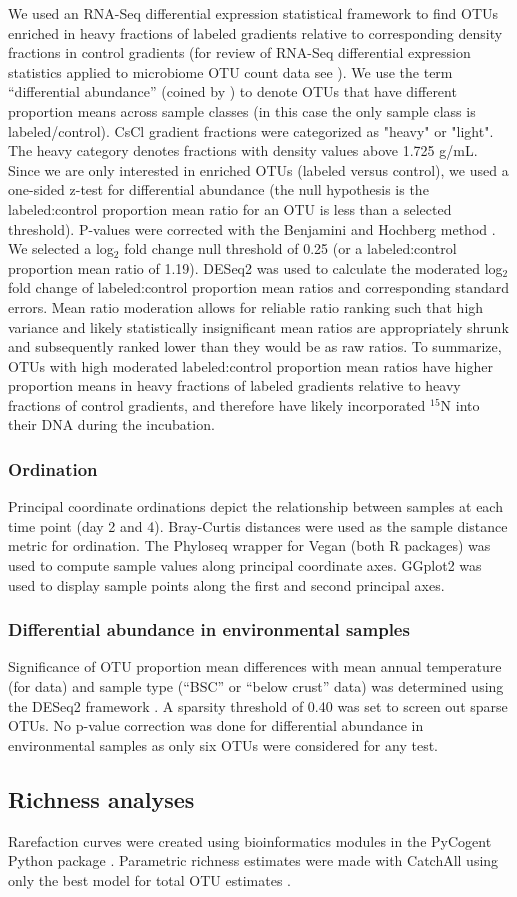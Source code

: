 We used an RNA-Seq differential expression statistical framework
\citep{Love_2014} to find OTUs enriched in heavy fractions of labeled
gradients relative to corresponding density fractions in control gradients
(for review of RNA-Seq differential expression statistics applied to
microbiome OTU count data see \citet{24699258}). We use the term
“differential abundance” (coined by \citet{24699258}) to denote OTUs that
have different proportion means across sample classes (in this case the only
sample class is labeled/control).  CsCl gradient fractions were categorized
as "heavy" or "light". The heavy category denotes fractions with density
values above 1.725 g/mL. Since we are only interested in enriched OTUs
(labeled versus control), we used a one-sided z-test for differential
abundance (the null hypothesis is the labeled:control proportion mean ratio
for an OTU is less than a selected threshold). P-values were corrected with
the Benjamini and Hochberg method \citep{citeulike:1042553}. We selected a
log$_{2}$ fold change null threshold of 0.25 (or a labeled:control proportion
mean ratio of 1.19). DESeq2 was used to calculate the moderated log$_{2}$
fold change of labeled:control proportion mean ratios and corresponding
standard errors. Mean ratio moderation allows for reliable ratio ranking such
that high variance and likely statistically insignificant mean ratios are
appropriately shrunk and subsequently ranked lower than they would be as raw
ratios. To summarize, OTUs with high moderated labeled:control proportion
mean ratios have higher proportion means in heavy fractions of labeled
gradients relative to heavy fractions of control gradients, and therefore
have likely incorporated $^{15}$N into their DNA during the incubation.

\subsubsection{Ordination}
Principal coordinate ordinations depict the relationship between samples at
each time point (day 2 and 4). Bray-Curtis distances were used as the sample
distance metric for ordination. The Phyloseq \citep{24699258} wrapper for Vegan
\citep{vegan} (both R packages) was used to compute sample values along
principal coordinate axes. GGplot2 \citep{ggplot2} was used to display sample
points along the first and second principal axes.  

\subsubsection{Differential abundance in environmental samples}
Significance of OTU proportion mean differences with mean annual temperature
(for \citet{Garcia_Pichel_2013} data) and sample type (``BSC'' or ``below crust''
\citet{Steven_2013} data) was determined using the DESeq2 framework
\citep{24699258, Love_2014}. A sparsity threshold of 0.40 was set to screen out
sparse OTUs. No p-value correction was done for differential abundance in 
environmental samples as only six OTUs were considered for any test.

\subsection{Richness analyses} Rarefaction curves were created using
bioinformatics modules in the PyCogent Python package \citep{Knight_2007}.
Parametric richness estimates were made with CatchAll using only the best model
for total OTU estimates \citep{BUNGE_2010}.
